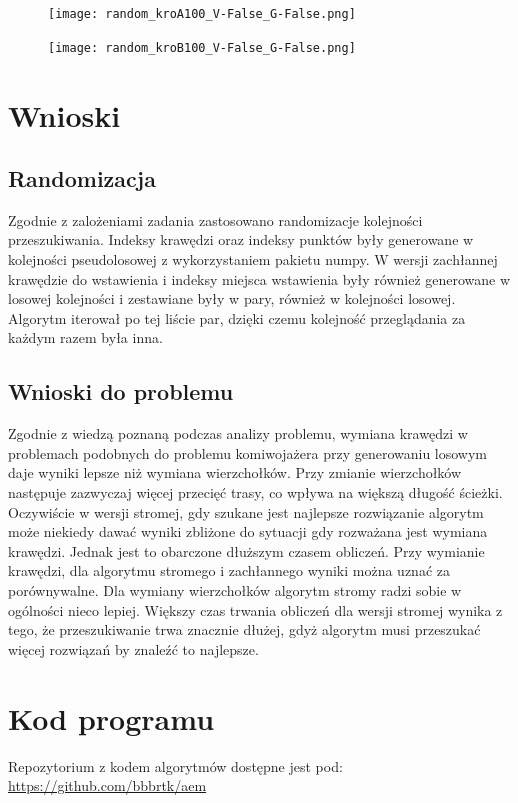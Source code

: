 \documentclass{article}
\begin{document}
\begin{figure}[h!]
    \centering
  \begin{minipage}[b]{0.5\textwidth}
    \texttt{[image: random\_kroA100\_V-False\_G-False.png]}
  \end{minipage}

  \begin{minipage}[b]{0.5\textwidth}
    \texttt{[image: random\_kroB100\_V-False\_G-False.png]}
  \end{minipage} 
\end{figure}

\section{Wnioski}
    \subsection{Randomizacja}
    Zgodnie z zalożeniami zadania zastosowano randomizacje kolejności przeszukiwania. Indeksy krawędzi oraz indeksy punktów były generowane w kolejności pseudolosowej z wykorzystaniem pakietu numpy. W wersji zachłannej krawędzie do wstawienia i indeksy miejsca wstawienia były również generowane w losowej kolejności i zestawiane były w pary, również w kolejności losowej. Algorytm iterował po tej liście par, dzięki czemu kolejność przeglądania za każdym razem była inna.
    
    \subsection{Wnioski do problemu}
    
    Zgodnie z wiedzą poznaną podczas analizy problemu, wymiana krawędzi w problemach podobnych do problemu komiwojażera przy generowaniu losowym daje wyniki lepsze niż wymiana wierzchołków. Przy zmianie wierzchołków następuje zazwyczaj więcej przecięć trasy, co wpływa na większą długość ścieżki. Oczywiście w wersji stromej, gdy szukane jest najlepsze rozwiązanie algorytm może niekiedy dawać wyniki zbliżone do sytuacji gdy rozważana jest wymiana krawędzi. Jednak jest to obarczone dłuższym czasem obliczeń. Przy wymianie krawędzi, dla algorytmu stromego i zachłannego wyniki można uznać za porównywalne. Dla wymiany wierzchołków algorytm stromy radzi sobie w ogólności nieco lepiej.  Większy czas trwania obliczeń dla wersji stromej wynika z tego, że przeszukiwanie trwa znacznie dłużej, gdyż algorytm musi przeszukać więcej rozwiązań by znaleźć to najlepsze.
    
\section{Kod programu}

    Repozytorium z kodem algorytmów dostępne jest pod: \url{https://github.com/bbbrtk/aem}
\end{document}
